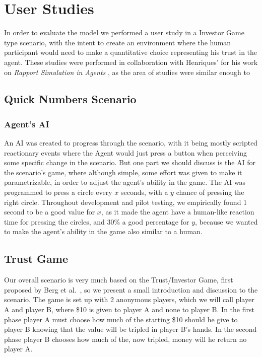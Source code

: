
\section{User Studies}
\label{sec:UserStudies}

In order to evaluate the model we performed a user study in a Investor Game type scenario, with the intent to create an environment where the human participant would need to make a quantitative choice representing his trust in the agent. These studies were performed in collaboration with Henriques' for his work on \textit{Rapport Simulation in Agents} \cite{todo}, as the area of studies were similar enough to 

\subsection{Quick Numbers Scenario}
\label{subsec:QuickNumbersScenario}

\subsubsection{Agent's \ac{AI}}
An \ac{AI} was created to progress through the scenario, with it being mostly scripted reactionary events where the Agent would just press a button when perceiving some specific change in the scenario. But one part we should discuss is the \ac{AI} for the scenario's game, where although simple, some effort was given to make it parametrizable, in order to adjust the agent's ability in the game. The \ac{AI} was programmed to press a circle every $x$ seconds, with a $y$ chance of pressing the right circle. Throughout development and pilot testing, we empirically found 1 second to be a good value for $x$, as it made the agent have a human-like reaction time for pressing the circles, and 30\% a good percentage for $y$, because we wanted to make the agent's ability in the game also similar to a human.

\subsection{Trust Game}
\label{subsec:Trustgame}
Our overall scenario is very much based on the Trust/Investor Game, first proposed by Berg et al.~\cite{JoyceBergJohnDickhaut}, so we present a small introduction and discussion to the scenario. The game is set up with 2 anonymous players, which we will call player A and player B, where \$10 is given to player A and none to player B. In the first phase player A must choose how much of the starting \$10 should he give to player B knowing that the value will be tripled in player B’s hands. In the second phase player B chooses how much of the, now tripled, money will he return no player A.

